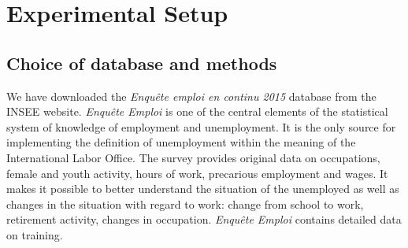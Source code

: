 \chapter{Experimental Setup}

\section{Choice of database and methods}
We have downloaded the \textit{Enqu\^ete emploi en continu 2015} database from the INSEE website.
\textit{Enqu\^ete Emploi} is one of the central elements of the statistical system of knowledge of
employment and unemployment. It is the only source for implementing the definition of unemployment
within the meaning of the International Labor Office. The survey provides original data on
occupations, female and youth activity, hours of work, precarious employment and wages. It makes it
possible to better understand the situation of the unemployed as well as changes in the situation
with regard to work: change from school to work, retirement activity, changes in occupation.
\textit{Enqu\^ete Emploi} contains detailed data on training.

